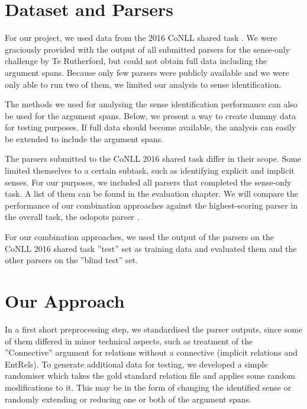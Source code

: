 \documentclass[10pt,notitlepage]{scrartcl}
\begin{document}
\section*{Dataset and Parsers}
For our project, we used data from the 2016 CoNLL shared task \cite{xue2016conll}. We were graciously provided with the output of all submitted parsers for the sense-only challenge by Te Rutherford, but could not obtain full data including the argument spans. Because only few parsers were publicly available and we were only able to run two of them, we limited our analysis to sense identification.

The methods we used for analysing the sense identification performance can also be used for the argument spans. Below, we present a way to create dummy data for testing purposes. If full data should become available, the analysis can easily be extended to include the argument spans.

The parsers submitted to the CoNLL 2016 shared task differ in their scope. Some limited themselves to a certain subtask, such as identifying explicit and implicit senses. For our purposes, we included all parsers that completed the sense-only task. A list of them can be found in the evaluation chapter. We will compare the performance of our combination approaches against the highest-scoring parser in the overall task, the oslopots parser \cite{oepen2016opt}.

For our combination approaches, we used the output of the parsers on the CoNLL 2016 shared task ''test'' set as training data and evaluated them and the other parsers on the ''blind test'' set.

\section*{Our Approach}
In a first short preprocessing step, we standardised the parser outputs, since some of them differed in minor technical aspects, such as treatment of the ''Connective'' argument for relations without a connective (implicit relations and EntRels). To generate additional data for testing, we developed a simple randomiser which takes the gold standard relation file and applies some random modifications to it. This may be in the form of changing the identified sense or randomly extending or reducing one or both of the argument spans.
\end{document}
